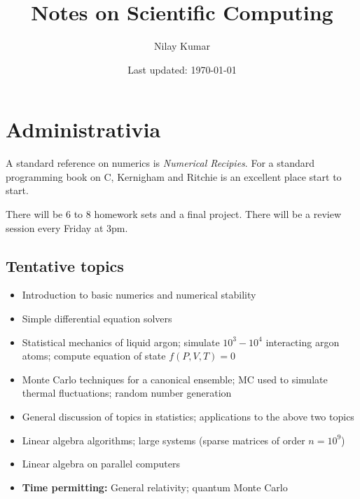 \documentclass{mathnotes}
\title{Notes on Scientific Computing}
\author{Nilay Kumar}
\date{Last updated: \today}
\begin{document}
\maketitle

\setcounter{section}{-1}

\section{Administrativia}

A standard reference on numerics is \textit{Numerical Recipies}. For a standard programming book on C, Kernigham and Ritchie is an excellent
place start to start. 

There will be 6 to 8 homework sets and a final project. There will be a review session every Friday at 3pm.

\subsection{Tentative topics}
\begin{itemize}
    \item Introduction to basic numerics and numerical stability
    \item Simple differential equation solvers
    \item Statistical mechanics of liquid argon; simulate $10^3-10^4$ interacting argon atoms; compute equation of state $f(P,V,T)=0$
    \item Monte Carlo techniques for a canonical ensemble; MC used to simulate thermal fluctuations; random number generation
    \item General discussion of topics in statistics; applications to the above two topics
    \item Linear algebra algorithms; large systems (sparse matrices of order $n=10^9$)
    \item Linear algebra on parallel computers
    \item \textbf{Time permitting:} General relativity; quantum Monte Carlo
\end{itemize}
\end{document}
